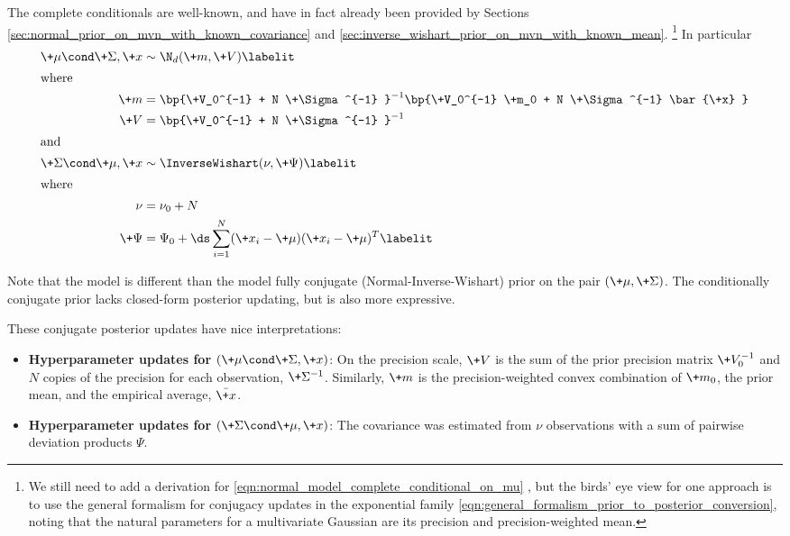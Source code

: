 \documentclass{article} %
\begin{document}
The complete conditionals are well-known,  and have in fact already been provided by Sections  \ref{sec:normal_prior_on_mvn_with_known_covariance} and \ref{sec:inverse_wishart_prior_on_mvn_with_known_mean}. \footnote{We still need to add a derivation for \eqref{eqn:normal_model_complete_conditional_on_mu} ,  but the birds' eye view for one approach is to use the general formalism for conjugacy updates in the exponential family \eqref{eqn:general_formalism_prior_to_posterior_conversion},  noting that the natural parameters for a multivariate Gaussian are its precision and precision-weighted mean. }    In particular
\begin{align*}
\+\mu  \cond \+\Sigma, \+x &\sim \N_{d}(\+m,\+V )  \labelit\label{eqn:normal_model_complete_conditional_on_mu} \\
\intertext{where}
\+m  &=  \bp{\+V_0^{-1} + N  \+\Sigma^{-1} }^{-1}  \bp{\+V_0^{-1} \+m_0 + N \+\Sigma^{-1}  \bar{\+x} } \\
\+V &= \bp{\+V_0^{-1} +  N \+\Sigma^{-1} }^{-1} \\
\intertext{and}
\+\Sigma \cond \+\mu,  \+x  &\sim \InverseWishart(\nu,  \+\Psi) 
\labelit \label{eqn:normal_model_complete_conditional_on_Sigma} \\
\intertext{where}
\nu &=  \nu_0 + N \\
\+\Psi &= \Psi_0 + \ds\sum_{i=1}^N  (\+x_i - \+\mu) (\+x_i - \+\mu)^T 
\labelit \label{eqn:Sigma_cc_normal_model_cond_conj_prior}\\ 
\end{align*}

Note that the model is different than the model  fully conjugate (Normal-Inverse-Wishart) prior on the pair $(\+\mu, \+\Sigma)$.   The conditionally conjugate prior lacks closed-form posterior updating,  but is also more expressive. 

These conjugate posterior updates have nice interpretations:
\begin{itemize}
\item \textbf{Hyperparameter updates for $(\+\mu  \cond \+\Sigma, \+x)$}: On the precision scale,  $\+V$ is the sum of the prior precision matrix $\+V_0^{-1}$ and $N$ copies of the precision for each observation,  $\+\Sigma^{-1}$.    Similarly,  $\+m$ is the precision-weighted convex combination of $\+m_0$, the prior mean,    and the empirical average, $\bar{\+x}$.
\item \textbf{Hyperparameter updates for $(\+\Sigma \cond \+\mu,  \+x)$}:  The covariance was estimated from $\nu$ observations with a sum of pairwise deviation products $\Psi$.
\end{itemize}
\end{document}
